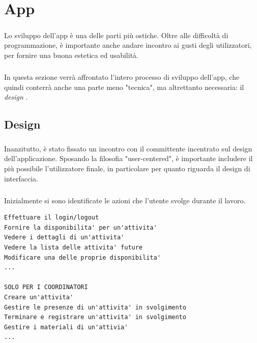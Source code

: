 \documentclass[12pt,a4paper,twoside,english,italian]{book}
\begin{document}
\chapter{App}

\paragraph{} Lo sviluppo dell'app è una delle parti più ostiche. Oltre alle difficoltà di programmazione, è importante anche andare incontro ai gusti degli utilizzatori, per fornire una buona estetica ed usabilità. 

\paragraph{} In questa sezione verrà affrontato l'intero processo di sviluppo dell'app, che quindi conterrà anche una parte meno "tecnica", ma altrettanto necessaria: il \emph{design} \cite{design}.

\section{Design} 

\paragraph{} Inanzitutto, è stato fissato un incontro con il committente incentrato sul design dell'applicazione. Sposando la filosofia "user-centered", è importante includere il più possibile l'utilizzatore finale, in particolare per quanto riguarda il design di interfaccia. 


\paragraph{} Inizialmente si sono identificate le azioni che l'utente svolge durante il lavoro. 

\begin{lstlisting}[title=Lista dei task]
Effettuare il login/logout
Fornire la disponibilita' per un'attivita'
Vedere i dettagli di un'attivita'
Vedere la lista delle attivita' future
Modificare una delle proprie disponibilita'
...

SOLO PER I COORDINATORI
Creare un'attivita'
Gestire le presenze di un'attivita' in svolgimento
Terminare e registrare un'attivita' in svolgimento
Gestire i materiali di un'attivia'
...
\end{lstlisting}
\end{document}
